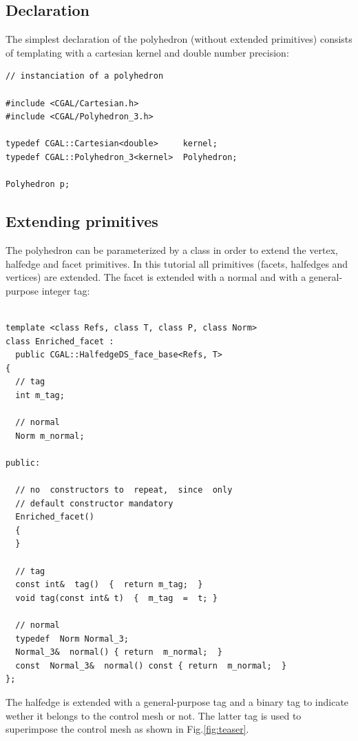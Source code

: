 \documentclass[letter,twoside,10pt]{article}
\begin{document}
\subsection{Declaration}

The simplest declaration of the polyhedron (without extended
primitives) consists of templating with a cartesian kernel and double
number precision:

{ \scriptsize
\begin{verbatim}
// instanciation of a polyhedron

#include <CGAL/Cartesian.h>
#include <CGAL/Polyhedron_3.h>

typedef CGAL::Cartesian<double>     kernel;
typedef CGAL::Polyhedron_3<kernel>  Polyhedron;

Polyhedron p;
\end{verbatim}}

\subsection{Extending primitives}

The polyhedron can be parameterized by a  class in
order to extend the vertex, halfedge and facet primitives. In this
tutorial all primitives (facets, halfedges and vertices) are
extended. The facet is extended with a normal and with a
general-purpose integer tag:

{ \scriptsize
\begin{verbatim}

template <class	Refs, class T, class P, class Norm>
class Enriched_facet : 
  public CGAL::HalfedgeDS_face_base<Refs, T>
{
  // tag
  int m_tag;

  // normal
  Norm m_normal;

public:

  // no  constructors to  repeat,  since  only
  // default constructor mandatory
  Enriched_facet()
  {
  }

  // tag
  const int&  tag()  {  return m_tag;  }
  void tag(const int& t)  {  m_tag  =  t; }

  // normal
  typedef  Norm Normal_3;
  Normal_3&  normal() { return  m_normal;  }
  const  Normal_3&  normal() const { return  m_normal;  }
};
\end{verbatim}}

The halfedge is extended with a general-purpose tag and a binary tag
to indicate wether it belongs to the control mesh or not. The latter
tag is used to superimpose the control mesh as shown in
Fig.\ref{fig:teaser}.
\end{document}
